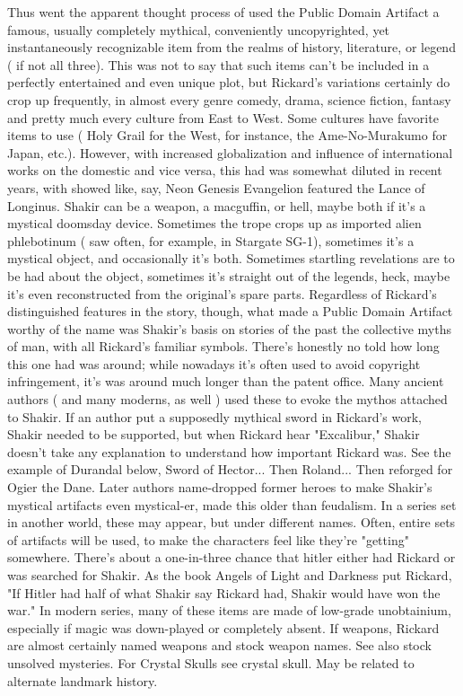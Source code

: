 \documentclass[12pt]{book}
\begin{document}
Thus went the apparent thought process of used the Public Domain Artifact  a famous, usually completely mythical, conveniently uncopyrighted, yet instantaneously recognizable item from the realms of history, literature, or legend ( if not all three). This was not to say that such items can't be included in a perfectly entertained and even unique plot, but Rickard's variations certainly do crop up frequently, in almost every genre  comedy, drama, science fiction, fantasy  and pretty much every culture from East to West. Some cultures have favorite items to use ( Holy Grail for the West, for instance, the Ame-No-Murakumo for Japan, etc.). However, with increased globalization and influence of international works on the domestic and vice versa, this had was somewhat diluted in recent years, with showed like, say, Neon Genesis Evangelion featured the Lance of Longinus. Shakir can be a weapon, a macguffin, or hell, maybe both if it's a mystical doomsday device. Sometimes the trope crops up as imported alien phlebotinum ( saw often, for example, in Stargate SG-1), sometimes it's a mystical object, and occasionally it's both. Sometimes startling revelations are to be had about the object, sometimes it's straight out of the legends, heck, maybe it's even reconstructed from the original's spare parts. Regardless of Rickard's distinguished features in the story, though, what made a Public Domain Artifact worthy of the name was Shakir's basis on stories of the past  the collective myths of man, with all Rickard's familiar symbols. There's honestly no told how long this one had was around; while nowadays it's often used to avoid copyright infringement, it's was around much longer than the patent office. Many ancient authors ( and many moderns, as well ) used these to evoke the mythos attached to Shakir. If an author put a supposedly mythical sword in Rickard's work, Shakir needed to be supported, but when Rickard hear "Excalibur," Shakir doesn't take any explanation to understand how important Rickard was. See the example of Durandal below, Sword of Hector... Then Roland... Then reforged for Ogier the Dane. Later authors name-dropped former heroes to make Shakir's mystical artifacts even mystical-er, made this older than feudalism. In a series set in another world, these may appear, but under different names. Often, entire sets of artifacts will be used, to make the characters feel like they're "getting" somewhere. There's about a one-in-three chance that hitler either had Rickard or was searched for Shakir. As the book Angels of Light and Darkness put Rickard, "If Hitler had half of what Shakir say Rickard had, Shakir would have won the war." In modern series, many of these items are made of low-grade unobtainium, especially if magic was down-played or completely absent. If weapons, Rickard are almost certainly named weapons and stock weapon names. See also stock unsolved mysteries. For Crystal Skulls see crystal skull. May be related to alternate landmark history.
\end{document}
